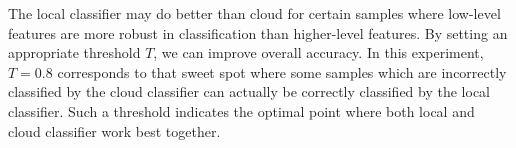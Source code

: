 \documentclass[10pt, conference, compsocconf]{IEEEtran}
\begin{document}

The local classifier may do better than cloud for certain samples where low-level features are more robust in classification than higher-level features. By setting an appropriate threshold $T$, we can improve overall accuracy. In this experiment, $T=0.8$ corresponds to that sweet spot where some samples which are incorrectly classified by the cloud classifier can actually be correctly classified by the local classifier. Such a threshold indicates the optimal point where both local and cloud classifier work best together.




\end{document}
